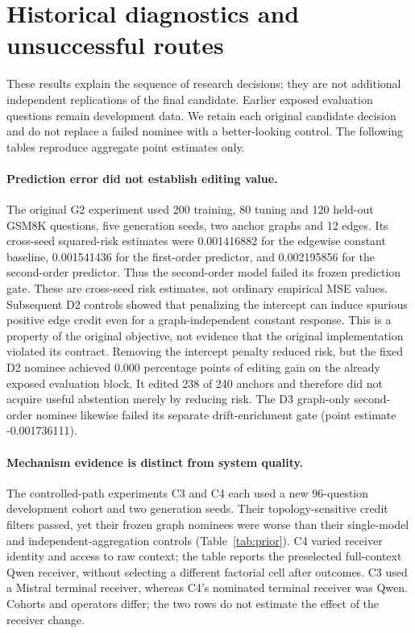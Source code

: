 \section{Historical diagnostics and unsuccessful routes}
\label{app:history}
These results explain the sequence of research decisions; they are not
additional independent replications of the final candidate. Earlier exposed
evaluation questions remain development data. We retain each original
candidate decision and do not replace a failed nominee with a better-looking
control. The following tables reproduce aggregate point estimates only.

\paragraph{Prediction error did not establish editing value.}
The original G2 experiment used 200 training, 80 tuning and 120 held-out
GSM8K questions, five generation seeds, two anchor graphs and 12 edges.
Its cross-seed squared-risk estimates were 0.001416882 for the edgewise constant
baseline, 0.001541436 for the first-order predictor, and 0.002195856 for the second-order
predictor. Thus the second-order model failed its frozen prediction gate.
These are cross-seed risk estimates, not ordinary empirical MSE values.
Subsequent D2 controls showed that penalizing the intercept can induce
spurious positive edge credit even for a graph-independent constant response.
This is a property of the original objective, not evidence that the original
implementation violated its contract. Removing the intercept penalty reduced
risk, but the fixed D2 nominee achieved 0.000 percentage points of editing
gain on the already exposed evaluation block. It edited 238 of 240 anchors
and therefore did not acquire useful abstention merely by reducing risk.
The D3 graph-only second-order nominee likewise failed its separate
drift-enrichment gate (point estimate -0.001736111).

\paragraph{Mechanism evidence is distinct from system quality.}
The controlled-path experiments C3 and C4 each used a new 96-question
development cohort and two generation seeds. Their topology-sensitive
credit filters passed, yet their frozen graph nominees were worse than
their single-model and independent-aggregation controls (Table~\ref{tab:prior}).
C4 varied receiver identity and access to raw context; the table reports
the preselected full-context Qwen receiver, without selecting a different
factorial cell after outcomes. C3 used a Mistral terminal receiver, whereas
C4's nominated terminal receiver was Qwen. Cohorts and operators differ;
the two rows do not estimate the effect of the receiver change.

